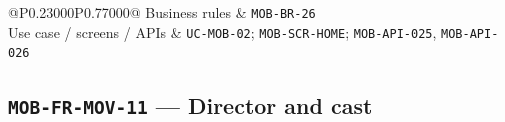 \begin{longtable}{@{}P{0.23000\SRSWidth}P{0.77000\SRSWidth}@{}}
Business rules & \texttt{MOB-\allowbreak{}BR-\allowbreak{}26} \\[3pt]
Use case /\allowbreak{} screens /\allowbreak{} APIs & \texttt{UC-\allowbreak{}MOB-\allowbreak{}02}; \texttt{MOB-\allowbreak{}SCR-\allowbreak{}HOME}; \texttt{MOB-\allowbreak{}API-\allowbreak{}025}, \texttt{MOB-\allowbreak{}API-\allowbreak{}026} \\[3pt]
\end{longtable}
\endgroup

\subsection{\texttt{MOB-\allowbreak{}FR-\allowbreak{}MOV-\allowbreak{}11} — Director and cast}
\begingroup
\fontsize{9.5}{12}\selectfont
\setlength{\SRSWidth}{\dimexpr\linewidth-2\tabcolsep\relax}
